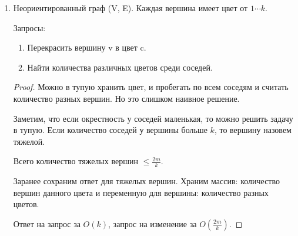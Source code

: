 \begin{enumerate}
\begin{proof}
\begin{enumerate}
    После k запросов $A \to A'$, можем найти элементы, которые были положительные и стали отрицательные. Для этих элементов
    локально в блоке ищем момент, когда этот элемент стал отрицательный
    
    Для построения массива $A'$ у нас будет вспомогательный массив pref, когда отрезок появляется делаем -x, когда кончается +x.

    swap(A, A')

    Время работы $O(\frac{Q}{k}(N + k) + N \cdot k)$ 
    $$k = \sqrt{Q}, O(N \sqrt{Q} + Q)$$
    \end{enumerate}
    \end{proof}
\item Неориентированный граф (V, E). Каждая вершина имеет цвет от $1 \cdots k$.

Запросы:
    \begin{enumerate}
    \item Перекрасить вершину v в цвет c.
    \item Найти количества различных цветов среди соседей.
    \end{enumerate} 
    \begin{proof}

    Можно в тупую хранить цвет, и пробегать по всем соседям и считать количество разных вершин. Но это слишком наивное решение.

   Заметим, что если окрестность у соседей маленькая, то можно решить задачу в тупую.
   Если количество соседей у вершины больше $k$, то вершину назовем тяжелой.

   Всего количество тяжелых вершин $\le \frac{2m}{k}$.

   Заранее сохраним ответ для тяжелых вершин. Храним массив: количество вершин данного цвета и 
   переменную для вершины: количество разных цветов.

   Ответ на запрос за $O(k)$, запрос на изменение за $O(\frac{2m}{k})$.
   \end{proof}
\end{enumerate}

